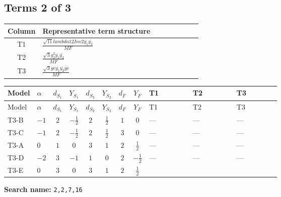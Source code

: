 \documentclass[8pt]{article}
\begin{document}
\begin{landscape}
\subsection*{Terms 2 of 3}
\begin{center}
\begin{tabular}{@{}c >{\raggedright\arraybackslash}p{0.82\linewidth}@{}}
\toprule
Column & Representative term structure \\
\midrule
T1 & \(\displaystyle \frac{\sqrt{11} lambda12Inv2 \overline{y_{1}} \overline{y_{2}}}{MF}\) \\
\midrule
T2 & \(\displaystyle \frac{\sqrt{3} g_{2}^{2} \overline{y_{1}} \overline{y_{2}}}{MF}\) \\
\midrule
T3 & \(\displaystyle \frac{\sqrt{3} ye \overline{y_{1}} \overline{y_{2}} \overline{ye}}{MF}\) \\
\midrule
\bottomrule
\end{tabular}
\end{center}
\smallskip
\tiny
\begin{longtable}{@{}llcccccc >{\raggedright\arraybackslash}p{0.21\linewidth} >{\raggedright\arraybackslash}p{0.21\linewidth} >{\raggedright\arraybackslash}p{0.21\linewidth}@{}}
\toprule
Model & $\alpha$ & $d_{S_1}$ & $Y_{S_1}$ & $d_{S_2}$ & $Y_{S_2}$ & $d_F$ & $Y_F$ & T1 & T2 & T3 \\
\midrule
\endfirsthead
\toprule
Model & $\alpha$ & $d_{S_1}$ & $Y_{S_1}$ & $d_{S_2}$ & $Y_{S_2}$ & $d_F$ & $Y_F$ & T1 & T2 & T3 \\
\midrule
\endhead
T3-B & $-1$ & $2$ & $-\frac{1}{2}$ & $2$ & $\frac{1}{2}$ & $1$ & $0$ & --- & --- & --- \\
\midrule
T3-C & $-1$ & $2$ & $-\frac{1}{2}$ & $2$ & $\frac{1}{2}$ & $3$ & $0$ & --- & --- & --- \\
\midrule
T3-A & $0$ & $1$ & $0$ & $3$ & $1$ & $2$ & $\frac{1}{2}$ & --- & --- & --- \\
\midrule
T3-D & $-2$ & $3$ & $-1$ & $1$ & $0$ & $2$ & $-\frac{1}{2}$ & --- & --- & --- \\
\midrule
T3-E & $0$ & $3$ & $0$ & $3$ & $1$ & $2$ & $\frac{1}{2}$ & \scriptsize\adjustbox{max width=\linewidth}{$\begin{gathered} \frac{3 \sqrt{11} lambda12Inv2 \overline{y_{1}} \overline{y_{2}}}{22 MF}\end{gathered}$} & \scriptsize\adjustbox{max width=\linewidth}{$\begin{gathered} \frac{49 \sqrt{3} g_{2}^{2} \overline{y_{1}} \overline{y_{2}}}{24 MF}\end{gathered}$} & \scriptsize\adjustbox{max width=\linewidth}{$\begin{gathered} - \frac{\sqrt{3} ye \overline{y_{1}} \overline{y_{2}} \overline{ye}}{12 MF}\end{gathered}$} \\
\midrule
\bottomrule
\end{longtable}
\clearpage
\noindent\textbf{Search name: }\texttt{2,2,7,16}\par\smallskip

\end{landscape}
\end{document}
